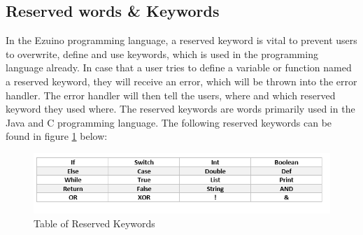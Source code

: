\subsection{Reserved words \& Keywords}
In the Ezuino programming language, a reserved keyword is vital to prevent users to overwrite, define and use keywords, which is used in the programming language already. In case that a user tries to define a variable or function named a reserved keyword, they will receive an error, which will be thrown into the error handler. The error handler will then tell the users, where and which reserved keyword they used where. The reserved keywords are words primarily used in the Java and C programming language. The following reserved keywords can be found in figure \ref{rk} below:
\begin{figure}[H]
\centering
\includegraphics[scale=0.90]{figures/reservedK.png}
\caption{Table of Reserved Keywords}
\label{rk}
\end{figure}

